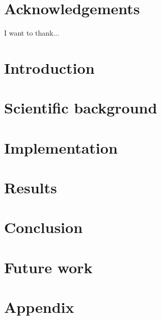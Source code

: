\documentclass[12pt, twoside]{report}
\begin{document}


\chapter*{Acknowledgements}
I want to thank...

\tableofcontents

\listoffigures

\listoftables

\chapter{Introduction}


\chapter{Scientific background}


\chapter{Implementation}


\chapter{Results}


\chapter{Conclusion}


\chapter{Future work}


\appendix
\chapter{Appendix}


\printbibliography
\end{document}
